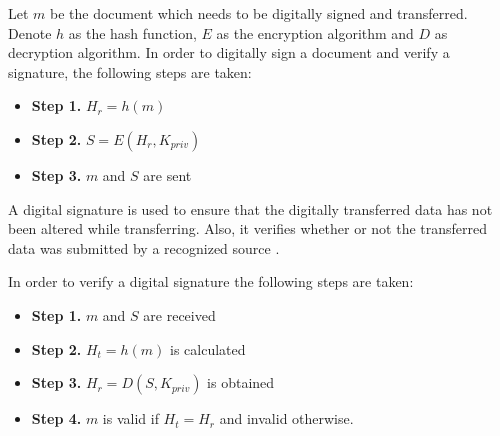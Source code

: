 \begin{defn} 
	Let $m$ be the document which needs to be digitally signed and transferred. Denote $h$ as the hash function, $E$ as the encryption algorithm and $D$ as decryption algorithm. In order to digitally sign a document and verify a signature, the following steps are taken:
	\begin{itemize}
		\item \textbf{Step 1.} $H_r = h(m)$
		\item \textbf{Step 2.} $S = E(H_r,K_{priv})$
		\item \textbf{Step 3.} $m$ and $S$ are sent
	\end{itemize}
\label{dfn:digital_signature}
\end{defn}

A digital signature is used to ensure that the digitally transferred data has not been altered while transferring. Also, it verifies whether or not the transferred data was submitted by a recognized source \cite{katz2010digital}.\\

\begin{defn}
	In order to verify a digital signature the following steps are taken:
	\begin{itemize}
		\item \textbf{Step 1.} $m$ and $S$ are received
		\item \textbf{Step 2.} $H_t = h(m)$ is calculated
		\item \textbf{Step 3.} $H_r = D(S,K_{priv})$ is obtained
		\item \textbf{Step 4.} $m$ is valid if $H_t = H_r$ and invalid otherwise.
	\end{itemize}
\label{dfn:signature_verification}
\end{defn}

